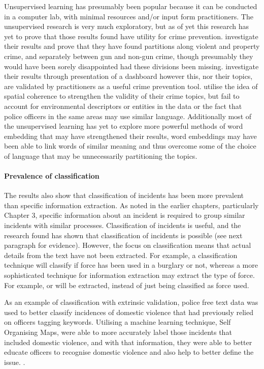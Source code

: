 Unsupervised learning has presumably been popular because it can be conducted in a computer lab, with minimal resources and/or input form practitioners. The unsupervised research is very much exploratory, but as of yet this research has yet to prove that those results found have utility for crime prevention. \textcite{kuang2017crime}  investigate their results and prove that they have found partitions along violent and property crime, and separately between gun and non-gun crime, though presumably they would have been sorely disappointed had these divisions been missing. \textcite{birks2020unsupervised}  investigate their results through presentation of a dashboard however this, nor their topics, are validated by practitioners as a useful crime prevention tool.  \textcite{Pandey201876} utilise the idea of spatial coherence to strengthen the validity of their crime topics, but fail to account for environmental descriptors or entities in the data or the fact that police officers in the same areas may use similar language. Additionally most of the unsupervised learning has yet to explore more powerful methods of word embedding that may have strengthened their results, word embeddings may have been able to link words of  similar meaning and thus overcome some of the choice of language that may be unnecessarily partitioning the topics.


\paragraph{Prevalence of classification}

The results also show that classification of incidents has been more prevalent than specific information extraction. As noted in the earlier chapters, particularly Chapter 3, specific information about an incident is required to group similar incidents with similar processes. Classification of incidents is useful, and the research found has shown that classification of incidents is possible (see next paragraph for evidence). However, the focus on classification means that actual details from the text have not been extracted. For example, a classification technique will classify if force has been used in a burglary or not, whereas a more sophisticated technique for information extraction may extract the type of force. For example,  or  will be extracted, instead of just being classified as force used.

As an example of classification with extrinsic validation, police free text data was used to better classify incidences of domestic violence that had previously relied on officers tagging keywords. Utilising a machine learning technique, Self Organising Maps, \textcite{Poelmans200911864} were able to more accurately label those incidents that included domestic violence, and with that information, they were able to better educate officers to recognise domestic violence and also help to better define the issue.  \parencite{ Poelmans2009247, Poelmans20113870, Poelmans200911864}.


